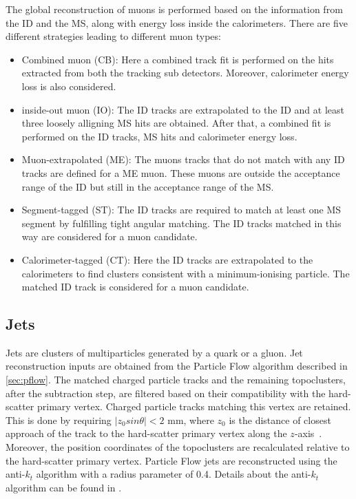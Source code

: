 The global reconstruction of muons is performed based on the information from the ID and the MS, along
with energy loss inside the calorimeters. There are five different strategies leading to different
muon types:
\begin{itemize}
    \item Combined muon (CB): Here a combined track fit is performed on the hits extracted from both
    the tracking sub detectors. Moreover, calorimeter energy loss is also considered. 
    \item inside-out muon (IO): The ID tracks are extrapolated to the ID and at least three loosely
    alligning MS hits are obtained. After that, a combined fit is performed on the ID tracks, MS hits
    and calorimeter energy loss. 
    \item Muon-extrapolated (ME): The muons tracks that do not match with any ID tracks are defined for
    a ME muon. These muons are outside the acceptance range of the ID but still in the acceptance range of the
    MS. 
    \item Segment-tagged (ST): The ID tracks are required to match at least one MS segment by fulfilling
    tight angular matching. The ID tracks matched in this way are considered for a muon candidate.
    \item Calorimeter-tagged (CT): Here the ID tracks are extrapolated to the calorimeters to find
    clusters consistent with a minimum-ionising particle. The matched ID track is considered for a 
    muon candidate. 
\end{itemize}


\subsection*{Jets}
Jets are clusters of multiparticles generated by a quark or a gluon.
Jet reconstruction inputs are obtained from the Particle Flow algorithm described in \cref{sec:pflow}. The
matched charged particle tracks and the remaining topoclusters, after the subtraction step, are 
filtered based on their compatibility with the hard-scatter primary vertex. Charged particle 
tracks matching this vertex are retained. This is done by requiring $|z_0 sin\theta|<2$ mm, 
where $z_0$ is the distance of closest approach of the track to the hard-scatter primary vertex 
along the $z$-axis~\cite{Aaboud:2257597}. Moreover, the position coordinates of the topoclusters are recalculated 
relative to the hard-scatter primary vertex. Particle Flow jets are reconstructed using the 
anti-$k_t$ algorithm with a radius parameter of 0.4. Details about the anti-$k_t$ algorithm 
can be found in \cite{Cacciari:2008gp}.


